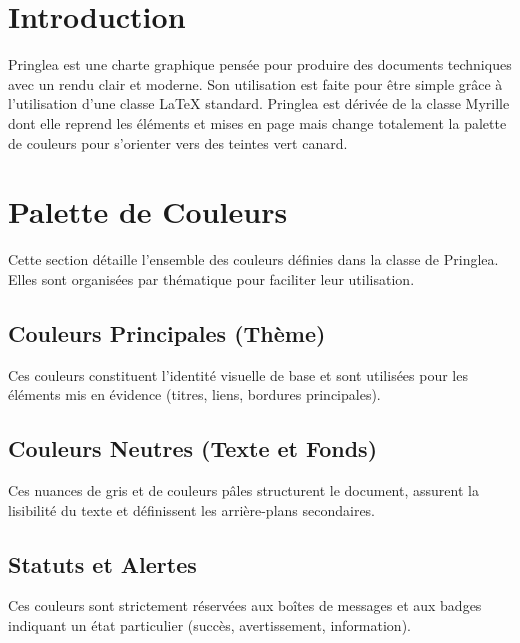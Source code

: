 \section{Introduction}
Pringlea est une charte graphique pensée pour produire des documents techniques avec un rendu clair et moderne. Son utilisation est faite pour être simple grâce à l'utilisation d'une classe \LaTeX{} standard. Pringlea est dérivée de la classe Myrille dont elle reprend les éléments et mises en page mais change totalement la palette de couleurs pour s'orienter vers des teintes vert canard.

\section{Palette de Couleurs}

Cette section détaille l'ensemble des couleurs définies dans la classe de Pringlea. Elles sont organisées par thématique pour faciliter leur utilisation. 

\subsection{Couleurs Principales (Thème)}
Ces couleurs constituent l'identité visuelle de base et sont utilisées pour les éléments mis en évidence (titres, liens, bordures principales).

\vspace{10pt}

\subsection{Couleurs Neutres (Texte et Fonds)}
Ces nuances de gris et de couleurs pâles structurent le document, assurent la lisibilité du texte et définissent les arrière-plans secondaires.

\vspace{10pt}

\subsection{Statuts et Alertes}
Ces couleurs sont strictement réservées aux boîtes de messages et aux badges indiquant un état particulier (succès, avertissement, information).


